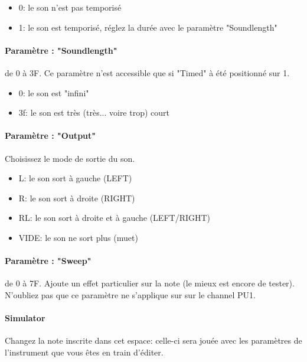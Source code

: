 \begin{itemize}
    \item{0: le son n'est pas temporisé}
    \item{1: le son est temporisé, réglez la durée avec le paramètre "Soundlength"}
\end{itemize}

\paragraph{Paramètre : "Soundlength"} de 0 à 3F.
Ce paramètre n'est accessible que si "Timed" à été positionné sur 1.
\medskip

\begin{itemize}
    \item{0: le son est "infini"}
    \item{3f: le son est très (très... voire trop) court}
\end{itemize}

\paragraph{Paramètre : "Output"} Choisissez le mode de sortie du son.
\medskip

\begin{itemize}
    \item{L: le son sort à gauche (LEFT)}
    \item{R: le son sort à droite (RIGHT)}
    \item{RL: le son sort à droite et à gauche (LEFT/RIGHT)}
    \item{VIDE: le son ne sort plus (muet)}
\end{itemize}

\paragraph{Paramètre : "Sweep"} de 0 à 7F.
Ajoute un effet particulier sur la note (le mieux est encore de tester).
N'oubliez pas que ce paramètre ne s'applique sur sur le channel PU1.

\paragraph{Simulator} Changez la note inscrite dans cet espace:
        celle-ci sera jouée avec les paramètres de l'instrument que vous êtes en train d'éditer.
